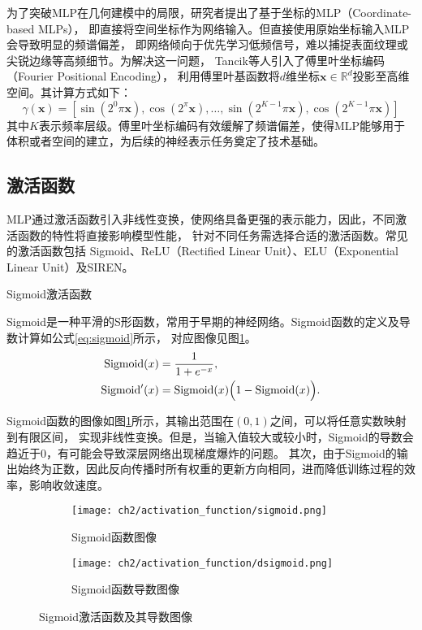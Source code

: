 为了突破MLP在几何建模中的局限，研究者提出了基于坐标的MLP（Coordinate-based MLPs），
即直接将空间坐标作为网络输入。但直接使用原始坐标输入MLP会导致明显的频谱偏差\cite{pmlr-v97-rahaman19a}，
即网络倾向于优先学习低频信号，难以捕捉表面纹理或尖锐边缘等高频细节。为解决这一问题，
Tancik等人\cite{tancik2020fourier}引入了傅里叶坐标编码（Fourier Positional Encoding），
利用傅里叶基函数将$d$维坐标$\mathbf{x}\in\mathbb{R}^d$投影至高维空间。其计算方式如下：
\begin{equation}
\gamma(\mathbf{x})=\left[\sin\left(2^0\pi \mathbf{x}\right),\cos\left(2^\pi \mathbf{x}\right),\ldots,\sin\left(2^{K-1}\pi \mathbf{x}\right),\cos\left(2^{K-1}\pi \mathbf{x}\right)\right]
\label{eq:fourier_encoding}
\end{equation}
其中$K$表示频率层级。傅里叶坐标编码有效缓解了频谱偏差，使得MLP能够用于体积或者空间的建立，为后续的神经表示任务奠定了技术基础。

\subsection{激活函数}

MLP通过激活函数引入非线性变换，使网络具备更强的表示能力，因此，不同激活函数的特性将直接影响模型性能，
针对不同任务需选择合适的激活函数。常见的激活函数包括
Sigmoid、ReLU（Rectified Linear Unit）、ELU（Exponential Linear Unit）及SIREN。

Sigmoid激活函数

Sigmoid是一种平滑的S形函数，常用于早期的神经网络。Sigmoid函数的定义及导数计算如公式\eqref{eq:sigmoid}所示，
对应图像见图\ref{fig:sigmoid}。
\begin{equation}
  \begin{aligned}
  \text{Sigmoid}(x) &= \frac{1}{1+e^{-x}}, \\
  \text{Sigmoid}'(x) &= \text{Sigmoid}(x)\Bigl(1-\text{Sigmoid}(x)\Bigr).
  \end{aligned}
  \label{eq:sigmoid}
\end{equation}

Sigmoid函数的图像如图\ref{fig:sigmoid}所示，其输出范围在$(0,1)$之间，可以将任意实数映射到有限区间，
实现非线性变换。但是，当输入值较大或较小时，Sigmoid的导数会趋近于0，有可能会导致深层网络出现梯度爆炸的问题。
其次，由于Sigmoid的输出始终为正数，因此反向传播时所有权重的更新方向相同，进而降低训练过程的效率，影响收敛速度。
\begin{figure}[H]
  \centering
  \begin{subfigure}[t]{0.45\textwidth}
    \centering
    \texttt{[image: ch2/activation\_function/sigmoid.png]}
    \caption{Sigmoid函数图像}
  \end{subfigure}
  \begin{subfigure}[t]{0.45\textwidth}
    \centering
    \texttt{[image: ch2/activation\_function/dsigmoid.png]}
    \caption{Sigmoid函数导数图像}
  \end{subfigure}
  \caption{Sigmoid激活函数及其导数图像}
  \label{fig:sigmoid}
\end{figure}

